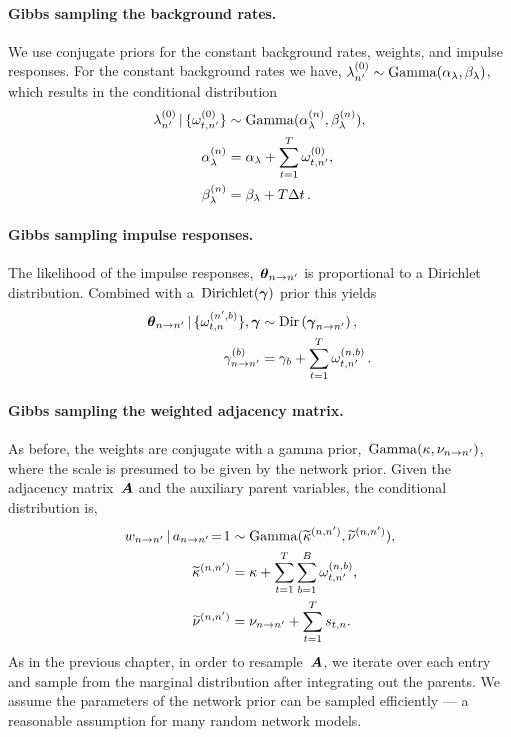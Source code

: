 \paragraph{Gibbs sampling the background rates.}
We use conjugate priors for the constant background rates, weights,
and impulse responses.  For the constant background rates we have,
${\lambda_{n'}^{(0)} \sim\mathrm{Gamma}(\alpha_\lambda, \beta_\lambda)}$,
which results in the conditional distribution
\begin{align*}
\lambda_{n'}^{(0)} \,|\, \{\omega_{t,n'}^{(0)}\} &\sim
\mathrm{Gamma}(\alpha_\lambda^{(n)}, \beta_\lambda^{(n)}), \\
\alpha_\lambda^{(n)} &= \alpha_\lambda + \sum_{t=1}^T \omega_{t,n'}^{(0)}, \\
\beta_\lambda^{(n)} &= \beta_\lambda + T \Delta t\,.
\end{align*}

\paragraph{Gibbs sampling impulse responses.}
The likelihood of the impulse responses,~$\boldsymbol{\theta}_{n \to n'}$ is
proportional to a Dirichlet distribution.  Combined with
a~$\text{Dirichlet}(\boldsymbol{\gamma})$ prior this yields
\begin{align*}
  \boldsymbol{\theta}_{n \to n'} \,|\, \{\omega_{t,n}^{(n',b)}\}, \boldsymbol{\gamma}
  &\sim \mathrm{Dir}\left( \boldsymbol{\gamma}_{n \to n'} \right), \\
  \gamma_{n \to n'}^{(b)} &=  \gamma_b + \sum_{t=1}^T \omega_{t,n'}^{(n, b)}\,.
\end{align*}

\paragraph{Gibbs sampling the weighted adjacency matrix.}
As before, the weights are conjugate with a gamma
prior,~$\mathrm{Gamma}(\kappa, \nu_{n \to n'})$, where the scale is presumed to
be given by the network prior.  Given the adjacency matrix~$\boldsymbol{A}$
and the auxiliary parent variables, the conditional distribution is,
\begin{align*}
  w_{n \to n'} \,|\, a_{n \to n'}\!=\!1
  &\sim \mathrm{Gamma}(\widetilde{\kappa}^{(n,n')}, \widetilde{\nu}^{(n,n')}), \\
  \widetilde{\kappa}^{(n,n')} &= \kappa + \sum_{t=1}^T \sum_{b=1}^B \omega_{t,n'}^{(n,b)}, \\
  \widetilde{\nu}^{(n,n')} &= \nu_{n \to n'} +  \sum_{t=1}^T s_{t,n}.
\end{align*}
As in the previous chapter, in order to resample~$\boldsymbol{A}$, we iterate over
each entry and sample from the marginal distribution after integrating
out the parents. We assume the parameters of the network prior can be
sampled efficiently --- a reasonable assumption for many random network
models.

